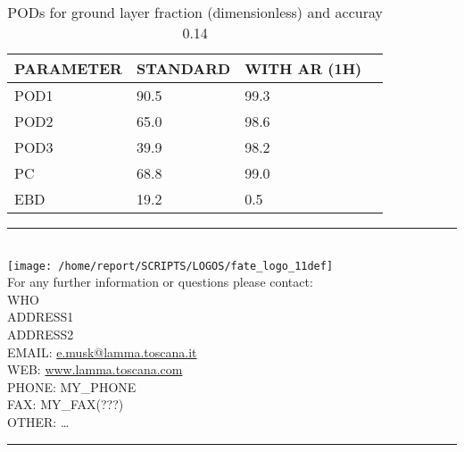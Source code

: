 \documentclass[11pt,english]{article}
\newcommand{\HRule}{\rule{\linewidth}{0.5mm}}
\begin{document}
\begin{table}[]
\begin{center}
\begin{tabular}{|l|l|l|l|}
\hline
\multicolumn{1}{|c|}{\cellcolor[HTML]{C0C0C0}\textbf{PARAMETER}} & \multicolumn{1}{c|}{\cellcolor[HTML]{C0C0C0}\textbf{STANDARD}} & \multicolumn{1}{c|}{\cellcolor[HTML]{C0C0C0}\textbf{WITH AR (1H)}} \\
\hline
\cellcolor[HTML]{C0C0C0}POD1  & 90.5                                & 99.3         \\
\cellcolor[HTML]{C0C0C0}POD2  & 65.0                                & 98.6         \\
\cellcolor[HTML]{C0C0C0}POD3  & 39.9                                & 98.2         \\
\cellcolor[HTML]{C0C0C0}PC    & 68.8                                  & 99.0           \\
\cellcolor[HTML]{C0C0C0}EBD   & 19.2                                 & 0.5          \\
\hline
\end{tabular}
\caption{PODs for ground layer fraction (dimensionless) and accuray 0.14}
\end{center}
\end{table}

\clearpage

\vspace{1.5cm}
\begin{flushleft}
\HRule \\[0.4cm]
{\texttt{[image: /home/report/SCRIPTS/LOGOS/fate\_logo\_11def]}}
\\
\Large{For any further information or questions please contact:
\\ WHO
\\ ADDRESS1
\\ ADDRESS2
\\ EMAIL: \href{mailto:e.musk@lamma.toscana.it}{e.musk@lamma.toscana.it}
\\ WEB: \href{www.lamma.toscana.com}{www.lamma.toscana.com}
\\ PHONE: MY\_PHONE
\\ FAX: MY\_FAX(???)
\\ OTHER: \dots}
\HRule \\[0.4cm]
\end{flushleft}

\end{document}

